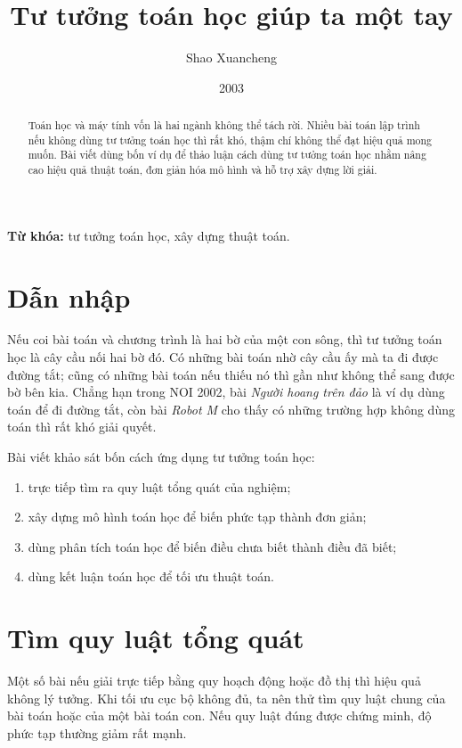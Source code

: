 \documentclass[11pt]{article}
\title{Tư tưởng toán học giúp ta một tay}
\author{Shao Xuancheng}
\date{2003}
\begin{document}
\maketitle


\begin{abstract}
Toán học và máy tính vốn là hai ngành không thể tách rời. Nhiều bài toán lập
trình nếu không dùng tư tưởng toán học thì rất khó, thậm chí không thể đạt
hiệu quả mong muốn. Bài viết dùng bốn ví dụ để thảo luận cách dùng tư tưởng
toán học nhằm nâng cao hiệu quả thuật toán, đơn giản hóa mô hình và hỗ trợ
xây dựng lời giải.
\end{abstract}

\noindent\textbf{Từ khóa:} tư tưởng toán học, xây dựng thuật toán.

\section{Dẫn nhập}

Nếu coi bài toán và chương trình là hai bờ của một con sông, thì tư tưởng
toán học là cây cầu nối hai bờ đó. Có những bài toán nhờ cây cầu ấy mà ta đi
được đường tắt; cũng có những bài toán nếu thiếu nó thì gần như không thể
sang được bờ bên kia. Chẳng hạn trong NOI 2002, bài \textit{Người hoang trên
đảo} là ví dụ dùng toán để đi đường tắt, còn bài \textit{Robot M} cho thấy có
những trường hợp không dùng toán thì rất khó giải quyết.

Bài viết khảo sát bốn cách ứng dụng tư tưởng toán học:

\begin{enumerate}
  \item trực tiếp tìm ra quy luật tổng quát của nghiệm;
  \item xây dựng mô hình toán học để biến phức tạp thành đơn giản;
  \item dùng phân tích toán học để biến điều chưa biết thành điều đã biết;
  \item dùng kết luận toán học để tối ưu thuật toán.
\end{enumerate}

\section{Tìm quy luật tổng quát}

Một số bài nếu giải trực tiếp bằng quy hoạch động hoặc đồ thị thì hiệu quả
không lý tưởng. Khi tối ưu cục bộ không đủ, ta nên thử tìm quy luật chung của
bài toán hoặc của một bài toán con. Nếu quy luật đúng được chứng minh, độ
phức tạp thường giảm rất mạnh.
\end{document}
